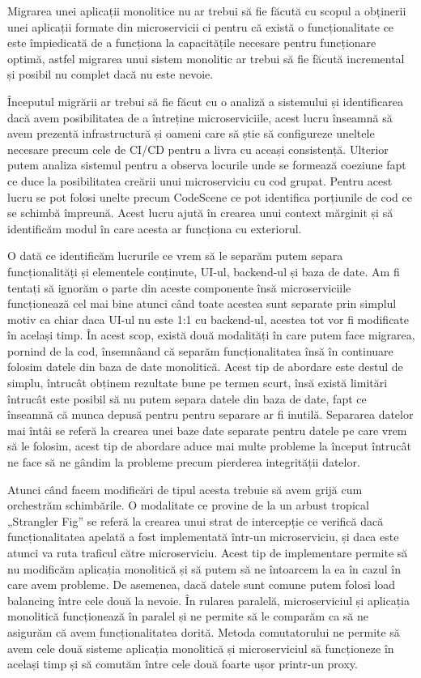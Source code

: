 Migrarea unei aplicații monolitice nu ar trebui să fie făcută cu scopul a obținerii unei aplicații
formate din microservicii ci pentru că există o funcționalitate ce este împiedicată de a
funcționa la capacitățile necesare pentru funcționare optimă, astfel migrarea unui sistem 
monolitic ar trebui să fie făcută incremental și posibil nu complet dacă nu este nevoie.

Începutul migrării ar trebui să fie făcut cu o analiză a sistemului și identificarea dacă 
avem posibilitatea de a întreține microserviciile, acest lucru înseamnă să avem prezentă infrastructură și
oameni care să știe să configureze uneltele necesare precum cele de CI/CD pentru a livra cu aceași consistență.
Ulterior putem analiza sistemul pentru a observa locurile unde se formează coeziune fapt
ce duce la posibilitatea creării unui microserviciu cu cod grupat. Pentru acest lucru se pot folosi 
unelte precum CodeScene ce pot identifica porțiunile de cod ce se schimbă împreună. Acest lucru 
ajută în crearea unui context mărginit și să identificăm modul în care acesta ar funcționa cu exteriorul.

O dată ce identificăm lucrurile ce vrem să le separăm putem separa funcționalități și elementele 
conținute, UI-ul, backend-ul și baza de date. Am fi tentați să ignorăm o parte din aceste componente
însă microserviciile funcționează cel mai bine atunci când toate acestea sunt separate prin simplul motiv
ca chiar daca UI-ul nu este 1:1 cu backend-ul, acestea tot vor fi modificate în același timp. În acest scop,
există două modalități în care putem face migrarea, pornind de la cod, însemnâand că separăm funcționalitatea
însă în continuare folosim datele din baza de date monolitică. Acest tip de abordare este destul de simplu,
întrucât obținem rezultate bune pe termen scurt, însă există limitări întrucât este posibil să nu
putem separa datele din baza de date, fapt ce înseamnă că munca depusă pentru pentru separare ar fi
inutilă. Separarea datelor mai întâi se referă la crearea unei baze date separate pentru datele 
pe care vrem să le folosim, acest tip de abordare aduce mai multe probleme la început întrucât 
ne face să ne gândim la probleme precum pierderea integrității datelor.

Atunci când facem modificări de tipul acesta trebuie să avem grijă cum orchestrăm schimbările.
O modalitate ce provine de la un arbust tropical „Strangler Fig” se referă la crearea unui strat
de intercepție ce verifică dacă funcționalitatea apelată a fost implementată într-un microserviciu,
și daca este atunci va ruta traficul către microserviciu. Acest tip de implementare permite să nu
modificăm aplicația monolitică și să putem să ne întoarcem la ea în cazul în care avem probleme.
De asemenea, dacă datele sunt comune putem folosi load balancing între cele două la nevoie.
În rularea paralelă, microserviciul și aplicația monolitică funcționează în paralel și ne permite să
le comparăm ca să ne asigurăm că avem funcționalitatea dorită. Metoda comutatorului ne permite
să avem cele două sisteme aplicația monolitică și microserviciul să funcționeze în același timp și să 
comutăm între cele două foarte ușor printr-un proxy.

